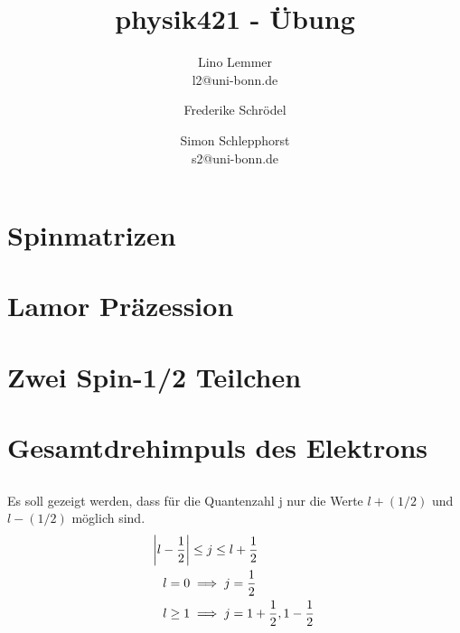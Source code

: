 

\setcounter{thezettel}{10}
\renewcommand\thesection{\arabic{thezettel}.\arabic{section}}



\title{physik421 - Übung }
\author{Lino Lemmer \\ \small{l2@uni-bonn.de} \and Frederike Schrödel \and Simon Schlepphorst\\ \small{s2@uni-bonn.de}}


\maketitle

\section{Spinmatrizen}

\section{Lamor Präzession}

\section{Zwei Spin-1/2 Teilchen}

\section{Gesamtdrehimpuls des Elektrons}

\subsection{}
Es soll gezeigt werden, dass für die Quantenzahl j nur die Werte $l + (1/2)$ und
$l - (1/2)$ möglich sind.
\begin{align*}
 \abs{l-\frac12} &\leq j \leq l + \frac12\\
 l = 0 &\implies j = \frac12\\
 l \geq 1 &\implies j = 1 + \frac12, 1 -\frac12
\end{align*}

